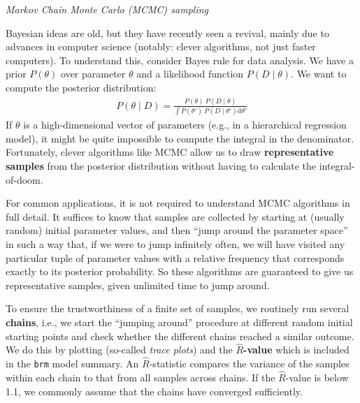 \documentclass[nobib]{tufte-handout}
\begin{document}
\begin{InfoBox}[]
\centering
\colorbox{mygray}{\centering
  \begin{minipage}{1\textwidth}

    \emph{Markov Chain Monte Carlo (MCMC) sampling}
    \medskip
 
    Bayesian ideas are old, but they have recently seen a revival, mainly due to
    advances in computer science (notably: clever algorithms, not just faster computers). To
    understand this, consider Bayes rule for data analysis. We have a prior $P(\theta)$ over
    parameter $\theta$ and a likelihood function $P(D\mid\theta)$. We want to compute
    the posterior distribution:
    \begin{eqnarray*}
      P(\theta \mid D) = \frac{P(\theta) \ P(D \mid \theta)}{ \int P(\theta') \ P(D \mid
      \theta') \textrm{d}\theta'}
    \end{eqnarray*}
    If $\theta$ is a high-dimensional vector of parameters (e.g., in a hierarchical regression model), it
    might be quite impossible to compute the integral in the denominator. Fortunately, clever
    algorithms like MCMC allow us to draw \textbf{representative samples} from the
    posterior distribution without having to calculate the integral-of-doom.

    \medskip
    
    For common applications, it is not required to understand MCMC algorithms in full detail.
    It suffices to know that samples are collected by starting at (usually random) initial
    parameter values, and then ``jump around the parameter space'' in such a way that, if we
    were to jump infinitely often, we will have visited any particular tuple of parameter
    values with a relative frequency that corresponds exactly to its posterior probability. So
    these algorithms are guaranteed to give us representative samples, given unlimited time to
    jump around.

    \medskip
    
    To ensure the trustworthiness of a finite set of samples, we routinely run several
    \textbf{chains}, i.e., we start the ``jumping around'' procedure at different random
    initial starting points and check whether the different chains reached a similar outcome.
    We do this by plotting (so-called \emph{trace plots}) and the \textbf{$\hat{R}$-value}
    which is included in the \texttt{brm} model summary. An $\hat{R}$-statistic compares the
    variance of the samples within each chain to that from all samples across chains. If the
    $\hat{R}$-value is below 1.1, we commonly assume that the chains have converged
    sufficiently.


\end{minipage}}
\end{InfoBox}
\end{document}
